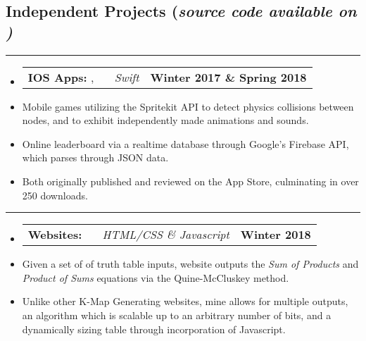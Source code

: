\documentclass[10pt,letterpaper]{article}
\makeatletter
\newcommand{\items}[2]
{
	\begin{tabular*}{\linewidth}{l @{\extracolsep{\fill}} r}
		#1 & #2 \\
	\end{tabular*}
}
\newcommand{\sectionbreak}
{
	\vspace{-1.2em}
	\rule{\textwidth}{1.7pt}
	\vspace{-1.7em}
}
\makeatother
\begin{document}
\vspace{-1.5em}

\subsection*{Independent Projects (\emph{source code available on \emph{\href{https://github.com/aashpointo}{\emph{\underline{}}}})}}
\sectionbreak

\begin{itemize}
	\item[]
		\items 
		{
			\textbf{IOS Apps: }
			\href{https://itunes.apple.com/us/app/round-bound/id1369632746?mt=8}{\emph{\underline{\smash{Round 'a Bound}}}}, 
			\href{https://itunes.apple.com/us/app/tic-tac-emoji/id1346934986?mt=8}{\emph{\underline{\smash{Tic-Tac Emoji}}}} \ \ \ \footnotesize \emph{Swift}
		}
			{\textbf{Winter 2017 \& Spring 2018}}
		\item 
			Mobile games utilizing the Spritekit API to detect physics collisions between nodes, and to exhibit independently made animations and sounds.
		\item
			Online leaderboard via a realtime database through Google's Firebase API, which parses through JSON data. 
		\item
			Both originally published and reviewed on the App Store, culminating in over 250 downloads.
\end{itemize}

\hrule

\begin{itemize}
	\item[]
		\items
			{	
				\textbf{Websites: }
				\href{https://aashpointo.github.io/KmapWebsite/}{\emph{\underline{\smash{aashpointo.github.io/KmapWebsite}}}} \ \ \ \footnotesize \emph{HTML/CSS \& Javascript}
				}
				{\textbf{Winter 2018}}
		\item
			Given a set of of truth table inputs, website outputs the \emph{Sum of Products} and \emph{Product of Sums} equations via the  Quine-McCluskey method. 
		\item 
			Unlike other K-Map Generating websites, mine allows for multiple outputs, an algorithm which is scalable up to an arbitrary number of bits, and a dynamically sizing table through incorporation of Javascript.

\end{itemize}
\end{document}
